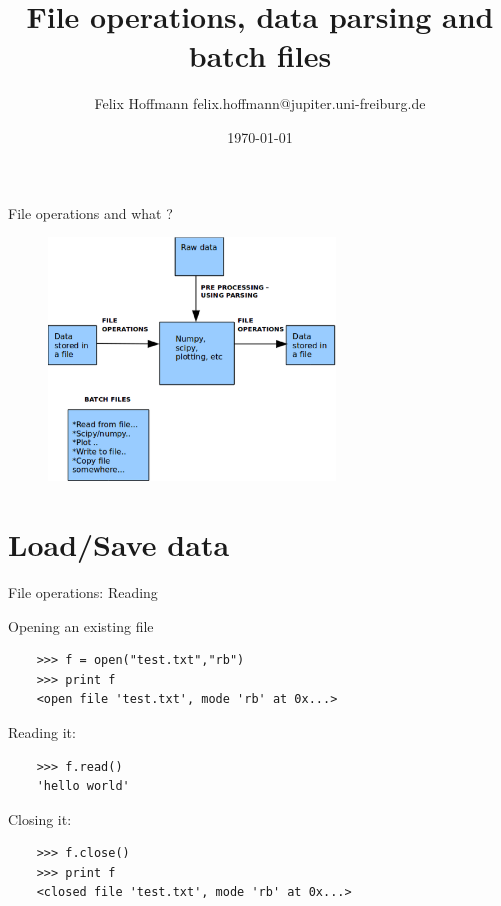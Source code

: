 \documentclass[xcolor=table,10pt,handout]{beamer}
\title {File operations, data parsing and batch files}
\author[Felix Hoffmann]{Felix Hoffmann \vspace{0.25cm} \newline \small felix.hoffmann@jupiter.uni-freiburg.de}
\institute[BCF]{Bernstein Center Freiburg}
\date{\today}
\begin{document}




\begin{frame} 
  \titlepage
\end{frame}



\begin{frame}{File operations and what ?}

  \begin{figure}
    \centering
    \includegraphics[width=3.0in]{Fits.eps}
  \end{figure}

\end{frame}



\section{Load/Save data}

\begin{frame}[fragile]{File operations: Reading}

  Opening an existing file 

  \begin{verbatim}
    >>> f = open("test.txt","rb")
    >>> print f
    <open file 'test.txt', mode 'rb' at 0x...>
  \end{verbatim}
  \bigskip
  \pause
  Reading it:
  \begin{verbatim}
    >>> f.read()
    'hello world'
  \end{verbatim}
  \pause
  \bigskip
  Closing it:
  \begin{verbatim}
    >>> f.close()
    >>> print f
    <closed file 'test.txt', mode 'rb' at 0x...>
  \end{verbatim}

\end{frame}
\end{document}
